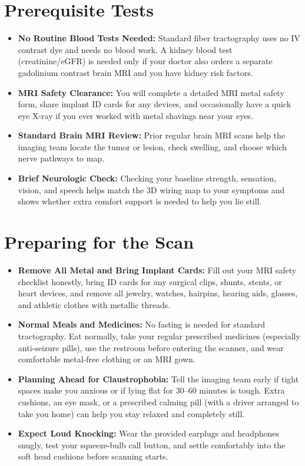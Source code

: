 \section{Prerequisite Tests}

\begin{itemize}
    \item \textbf{No Routine Blood Tests Needed:} Standard fiber tractography uses no IV contrast dye and needs no blood work. A kidney blood test (creatinine/eGFR) is needed only if your doctor also orders a separate gadolinium contrast brain MRI and you have kidney risk factors.
    \item \textbf{MRI Safety Clearance:} You will complete a detailed MRI metal safety form, share implant ID cards for any devices, and occasionally have a quick eye X-ray if you ever worked with metal shavings near your eyes.
    \item \textbf{Standard Brain MRI Review:} Prior regular brain MRI scans help the imaging team locate the tumor or lesion, check swelling, and choose which nerve pathways to map.
    \item \textbf{Brief Neurologic Check:} Checking your baseline strength, sensation, vision, and speech helps match the 3D wiring map to your symptoms and shows whether extra comfort support is needed to help you lie still.
\end{itemize}

\section{Preparing for the Scan}

\begin{itemize}
    \item \textbf{Remove All Metal and Bring Implant Cards:} Fill out your MRI safety checklist honestly, bring ID cards for any surgical clips, shunts, stents, or heart devices, and remove all jewelry, watches, hairpins, hearing aids, glasses, and athletic clothes with metallic threads.
    \item \textbf{Normal Meals and Medicines:} No fasting is needed for standard tractography. Eat normally, take your regular prescribed medicines (especially anti-seizure pills), use the restroom before entering the scanner, and wear comfortable metal-free clothing or an MRI gown.
    \item \textbf{Planning Ahead for Claustrophobia:} Tell the imaging team early if tight spaces make you anxious or if lying flat for 30--60 minutes is tough. Extra cushions, an eye mask, or a prescribed calming pill (with a driver arranged to take you home) can help you stay relaxed and completely still.
    \item \textbf{Expect Loud Knocking:} Wear the provided earplugs and headphones snugly, test your squeeze-bulb call button, and settle comfortably into the soft head cushions before scanning starts.
\end{itemize}

